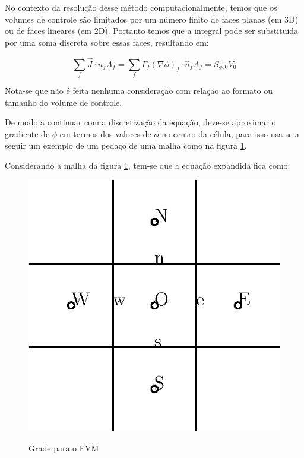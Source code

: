 No contexto da resolução desse método computacionalmente, temos que os volumes de controle são limitados por um número finito de faces planas (em 3D) ou de faces lineares (em 2D). Portanto temos que a integral pode ser substituida por uma soma discreta sobre essas faces, resultando em:

\begin{equation}
    \sum_f \vec{J} \cdot \hat{n}_f A_f = \sum_f \Gamma_f (\nabla \phi)_f \cdot \hat{n}_f A_f = S_{\phi,0} V_0
\end{equation}

Nota-se que não é feita nenhuma consideração com relação ao formato ou tamanho do volume de controle.

De modo a continuar com a discretização da equação, deve-se aproximar o gradiente de $\phi$ em termos dos valores de $\phi$ no centro da célula, para isso usa-se a seguir um exemplo de um pedaço de uma malha como na figura \ref{fig:fig1}.

Considerando a malha da figura \ref{fig:fig1}, tem-se que a equação expandida fica como:

\begin{figure}
    \centering
    \caption{Grade para o FVM}
    \includegraphics{fig/figura1}
    \label{fig:fig1}    
\end{figure}

